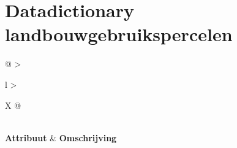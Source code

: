 \section{Datadictionary landbouwgebruikspercelen}
\label{app:datadictionary}

\setlength{\LTpre}{0pt}
\setlength{\LTpost}{0pt}

{
    \footnotesize
    \begin{xltabular}{\textwidth}{@{} >{\raggedright\arraybackslash}l >{\raggedright\arraybackslash}X @{}}
        \caption{Beschrijving van de attributen in de dataset `landbouwgebruikspercelen' \autocite{vlaanderen_landbouwpercelen_2025}}\label{app:ontwikkelingTool_landbouwkaart-vlaanderen-attributen} \\

        \toprule
        \textbf{Attribuut} & \textbf{Omschrijving} \\
        \midrule
        \endfirsthead



\end{xltabular}}
